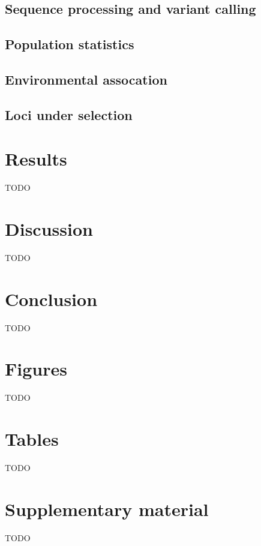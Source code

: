 \documentclass[fleqn,10pt]{wlpeerj}
\begin{document}
\subsection*{Sequence processing and variant calling}


\subsection*{Population statistics}

\subsection*{Environmental assocation}

\subsection*{Loci under selection}


\subsection*{}

\section*{Results}
TODO


\section*{Discussion}
TODO


\section*{Conclusion}
TODO


\section*{Figures}
TODO

\section*{Tables}
TODO

\section*{Supplementary material}
TODO

\clearpage

\end{document}
